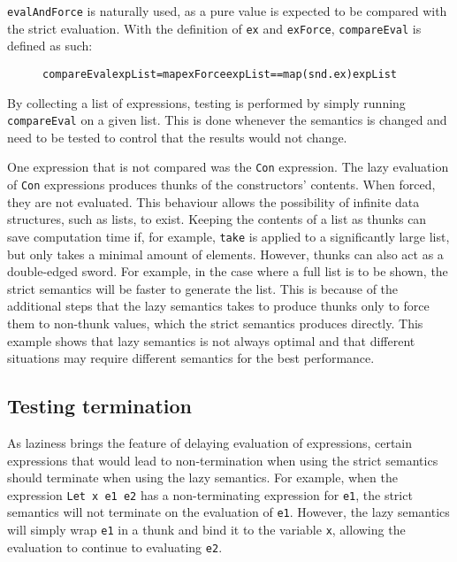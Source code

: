 \noindent \texttt{evalAndForce} is naturally used, as a pure value is expected
to be compared with the strict evaluation. With the definition of \texttt{ex}
and \texttt{exForce}, \texttt{compareEval} is defined as such:

\begin{figure}[H]
\begin{alltt}
  compareEval expList = map exForce expList == map (snd . ex) expList
\end{alltt}
\end{figure}

By collecting a list of expressions, testing is performed by simply running
\texttt{compareEval} on a given list. This is done whenever the semantics is
changed and need to be tested to control that the results would not change.

One expression that is not compared was the \texttt{Con} expression. The lazy
evaluation of \texttt{Con} expressions produces thunks of the constructors'
contents. When forced, they are not evaluated. This behaviour allows the
possibility of infinite data structures, such as lists, to exist.
Keeping the contents of a list as thunks can save computation time if,
for example, \texttt{take} is applied to a significantly large list, but only
takes a minimal amount of elements. However, thunks can also
act as a double-edged sword. For example, in the case where a full list is to be
shown, the strict semantics will be faster to generate the list. This is because
of the additional steps that the lazy semantics takes to produce thunks only to
force them to non-thunk values, which the strict semantics produces directly.
This example shows that lazy semantics is not always optimal and that different
situations may require different semantics for the best performance.

\subsection{Testing termination}
As laziness brings the feature of delaying evaluation of expressions, certain
expressions that would lead to non-termination when using the strict semantics
should terminate when using the lazy semantics. For example, when the expression
\texttt{Let x e1 e2} has a non-terminating expression for \texttt{e1}, the
strict semantics will not terminate on the evaluation of \texttt{e1}. However,
the lazy semantics will simply wrap \texttt{e1} in a thunk and bind it to the
variable \texttt{x}, allowing the evaluation to continue to evaluating
\texttt{e2}.

